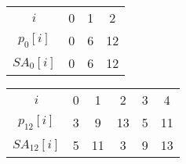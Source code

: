 \begin{table}[H]
	\centering
	\begin{tabular}{c| c c c }
		$i$ & 0 & 1 & 2 \\
		$p_0[i]$ & 0 & 6 & 12 \\
		$SA_0[i]$ & 0 & 6 & 12 
	\end{tabular}
\end{table}
\begin{table}[H]
	\centering
	\begin{tabular}{c| c c c c c }
		$i$ & 0 & 1 & 2 & 3 & 4 \\
		$p_{12}[i]$ & 3 & 9 & 13 & 5 & 11 \\
		$SA_{12}[i]$ & 5 & 11 & 3 & 9 & 13 
	\end{tabular}
\end{table}

